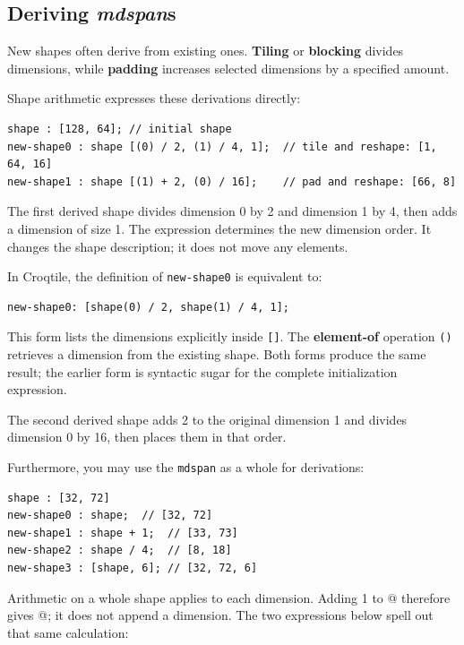 \subsection*{Deriving \emph{mdspan}s}

New shapes often derive from existing ones. \textbf{Tiling} or \textbf{blocking} divides dimensions, while \textbf{padding} increases selected dimensions by a specified amount.

Shape arithmetic expresses these derivations directly:

\begin{lstlisting}[language=croqtile,caption={The original shape}]
shape : [128, 64]; // initial shape
new-shape0 : shape [(0) / 2, (1) / 4, 1];  // tile and reshape: [1, 64, 16]
new-shape1 : shape [(1) + 2, (0) / 16];    // pad and reshape: [66, 8]
\end{lstlisting}

The first derived shape divides dimension 0 by 2 and dimension 1 by 4, then adds a dimension of size 1. The expression determines the new dimension order. It changes the shape description; it does not move any elements.

In Croqtile, the definition of \texttt{new-shape0} is equivalent to:

\begin{lstlisting}[language=croqtile,caption={A derived shape}]
new-shape0: [shape(0) / 2, shape(1) / 4, 1];
\end{lstlisting}

This form lists the dimensions explicitly inside \texttt{[]}. The \textbf{element-of} operation \texttt{()} retrieves a dimension from the existing shape. Both forms produce the same result; the earlier form is syntactic sugar for the complete initialization expression.

The second derived shape adds 2 to the original dimension 1 and divides dimension 0 by 16, then places them in that order.

Furthermore, you may use the \texttt{mdspan} as a whole for derivations:

\begin{lstlisting}[language=croqtile,caption={Rebinding a shape}]
shape : [32, 72]
new-shape0 : shape;  // [32, 72]
new-shape1 : shape + 1;  // [33, 73]
new-shape2 : shape / 4;  // [8, 18]
new-shape3 : [shape, 6]; // [32, 72, 6]
\end{lstlisting}

Arithmetic on a whole shape applies to each dimension. Adding 1 to \co@[128, 64]@ therefore gives \co@[129, 65]@; it does not append a dimension. The two expressions below spell out that same calculation:

